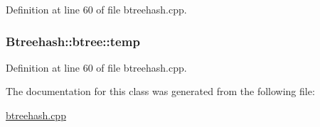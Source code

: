 Definition at line 60 of file btreehash.\-cpp.

\hypertarget{class_btreehash_1_1btree_a785116425de458e863e80fdb5b866282}{
\subsubsection[{temp}]{ Btreehash\-::btree\-::temp}}\label{class_btreehash_1_1btree_a785116425de458e863e80fdb5b866282}


Definition at line 60 of file btreehash.\-cpp.



The documentation for this class was generated from the following file\-:\begin{DoxyCompactItemize}
\item 
\hyperlink{btreehash_8cpp}{btreehash.\-cpp}\end{DoxyCompactItemize}
